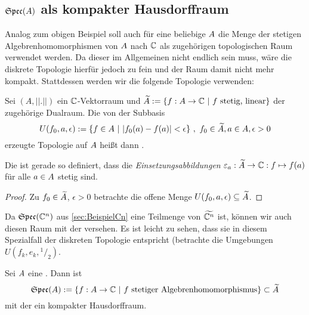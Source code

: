 \subsection{$\mathfrak{Spec}(A)$ als kompakter Hausdorffraum}\label{sec:SpecCA}

Analog zum obigen Beispiel soll auch für eine beliebige \CAlg{} $A$ die Menge der stetigen Algebrenhomomorphismen von $A$ nach $\mathbb{C}$ als zugehörigen topologischen Raum verwendet werden. Da dieser im Allgemeinen nicht endlich sein muss, wäre die diskrete Topologie hierfür jedoch zu fein und der Raum damit nicht mehr kompakt. Stattdessen werden wir die folgende Topologie verwenden:

\begin{defn}[\ssTop]\label{defn:schwachSternTop}
Sei $(A, ||.||)$ ein $\mathbb{C}$-Vektorraum und $\widetilde{A} := \{f: A \to \mathbb{C} ~|~ f \text{ stetig, linear}\}$ der zugehörige Dualraum. Die von der Subbasis
\[ U(f_0, a, \epsilon) := \{f \in A ~|~ |f_0(a)-f(a)| < \epsilon\} ~,~ f_0 \in \widetilde{A}, a \in A, \epsilon > 0\]
erzeugte Topologie auf $A$ heißt dann \emph{\ssTop}.
\end{defn}

\begin{kor}\label{bem:Einsetz-stetig}
Die \ssTop{} ist gerade so definiert, dass die \emph{Einsetzungsabbildungen} $\varepsilon_a: \widetilde{A} \to \mathbb{C}: f \mapsto f(a)$ für alle $a\in A$ stetig sind.
\end{kor}

\begin{proof}
Zu $f_0 \in \widetilde{A}$, $\epsilon > 0$ betrachte die offene Menge $U(f_0, a, \epsilon) \subseteq \widetilde{A}$.
\end{proof}

\begin{bem}
Da $\mathfrak{Spec}(\mathbb{C}^n)$ aus \cref{sec:BeispielCn} eine Teilmenge von $\widetilde{\mathbb{C}^n}$ ist, können wir auch diesen Raum mit der \ssTop{} versehen. Es ist leicht zu sehen, dass sie in diesem Spezialfall der diskreten Topologie entspricht (betrachte die Umgebungen $U(f_k, e_k, {}^1/_2)$.
\end{bem}

\begin{lemma}\label{lemma:MA}
Sei $A$ eine \CAlg. Dann ist
\[\mathfrak{Spec}(A) := \{f: A \to \mathbb{C} ~|~ f \text{ stetiger Algebrenhomomorphismus}\} \subset \widetilde{A}\]
mit der \ssTop{} ein kompakter Hausdorffraum.
\end{lemma}

